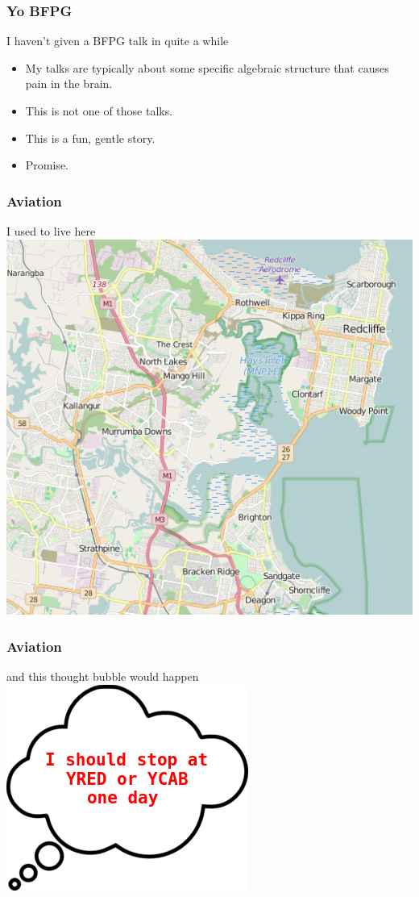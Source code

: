 \begin{frame}
\frametitle{Yo BFPG}
\begin{block}{I haven't given a BFPG talk in quite a while}
\begin{itemize}
\item<1-> My talks are typically about some specific algebraic structure that
          causes pain in the brain.
\item<2-> This is not one of those talks.
\item<3-> This is a fun, gentle story.
\item<4-> Promise.
\end{itemize}
\end{block}
\end{frame}

\begin{frame}
\frametitle{Aviation}
\begin{block}{I used to live here}
\includegraphics[height=0.5\textheight]{image/north-brisbane.png}
\end{block}
\end{frame}

\begin{frame}
\frametitle{Aviation}
\begin{block}{and this thought bubble would happen}
\includegraphics[height=0.5\textheight]{image/thought-bubble-stop-at-YRED.png}
\end{block}
\end{frame}


